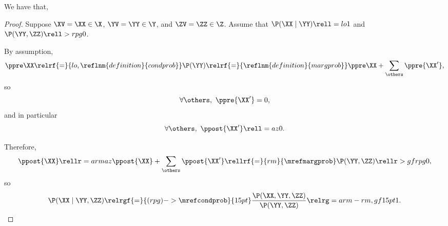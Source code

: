 \begin{proposition}
  We have that, %
\end{proposition}

\begin{proof}
  Suppose 
  $\XV = \XX \in \X$,
  $\YV = \YY \in \Y$, and
  $\ZV = \ZZ \in \Z$. Assume that $\P(\XX \mid \YY) \rell = lo 1$ and $\P(\YY, \ZZ) \rell > rpg 0$.

  By assumption,
  $$\ppre\XX \relrf{=}{lo,\reflnm{definition}{condprob}} \P(\YY) 
  \relrf{=}{\reflnm{definition}{margprob}} \ppre\XX + \sum_{\others}\ppre{\XX'},$$
    so
    $$\forall \others,\ \ppre{\XX'} = 0,$$
  and in particular
  $$\forall \others,\ \ppost{\XX'} \rell = az 0.$$

  Therefore, $$\ppost{\XX} \rellr = arm az \ppost{\XX} + \sum_{\others}\ppost{\XX'} 
  \rellrf{=}{rm}{\mrefmargprob} \P(\YY, \ZZ) \rellr > gf rpg 0,$$
  so $$\P(\XX \mid \YY, \ZZ) 
  \relrgf{=}{(rpg)->\mrefcondprob}{15pt} \frac{\P(\XX, \YY, \ZZ)}{\P(\YY, \ZZ)} 
  \relrg = arm-rm,gf 15pt 1.$$%
\end{proof}
